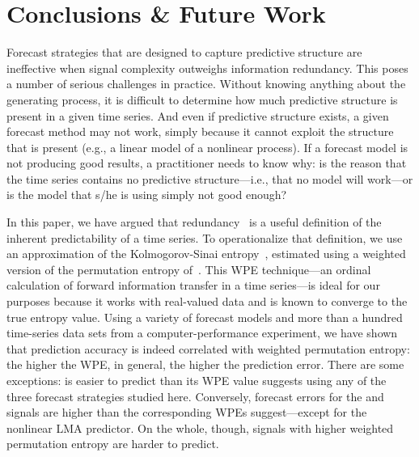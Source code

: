 \section{ Conclusions \& Future Work }\label{sec:conc}

Forecast strategies that are designed to capture predictive structure
are ineffective when signal complexity outweighs information
redundancy.  This poses a number of serious challenges in practice.
Without knowing anything about the generating process, it is difficult
to determine how much predictive structure is present in a given time
series.  And even if predictive structure exists, a given forecast
method may not work, simply because it cannot exploit the structure
that is present (e.g., a linear model of a nonlinear process).  If a
forecast model is not producing good results, a practitioner needs to
know why: is the reason that the time series contains no predictive
structure---i.e., that no model will work---or is the model that s/he
is using simply not good enough?

In this paper, we have argued that redundancy~\cite{crutchfield2003}
is a useful definition of the inherent predictability of a time
series.  To operationalize that definition, we use an approximation of
the Kolmogorov-Sinai entropy~\cite{lind95}, estimated using a weighted
version of the permutation entropy of~\cite{bandt2002per}.  This WPE
technique---an ordinal calculation of forward information transfer in
a time series---is ideal for our purposes because it works with
real-valued data and is known to converge to the true entropy value.
Using a variety of forecast models and more than a hundred time-series
data sets from a computer-performance experiment, we have shown that
prediction accuracy is indeed correlated with weighted permutation
entropy: the higher the WPE, in general, the higher the prediction
error.  There are some exceptions: \svdone is easier to predict than
its WPE value suggests using any of the three forecast strategies
studied here.  Conversely, forecast errors for the \col and \svdfive
signals are higher than the corresponding WPEs suggest---except for
the nonlinear LMA predictor.  On the whole, though, signals with
higher weighted permutation entropy are harder to predict.


